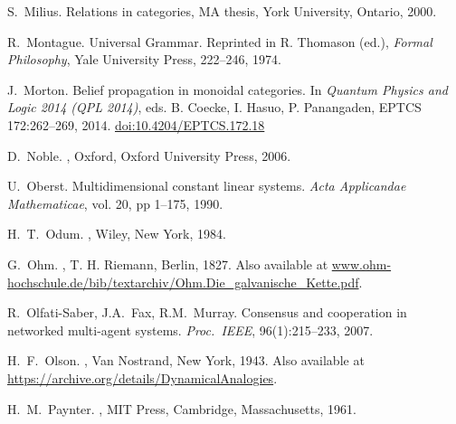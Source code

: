 \begin{thebibliography}{RSW00}
    S.\ Milius.
    \newblock Relations in categories, MA thesis, York University,
    Ontario, 2000.

    R.\ Montague.
    \newblock Universal Grammar.
    \newblock Reprinted in R. Thomason (ed.), {\em Formal Philosophy}, Yale
    University Press, 222--246, 1974. 

    J.\ Morton.
    \newblock Belief propagation in monoidal categories. 
    \newblock In {\em Quantum Physics and Logic 2014 (QPL 2014)}, eds. B.
    Coecke, I. Hasuo, P. Panangaden, EPTCS 172:262--269, 2014.  
    \newblock
    \href{http://dx.doi.org/10.4204/EPTCS.172.18}{doi:10.4204/EPTCS.172.18 }
    
    D.\ Noble.
    , Oxford, Oxford
    University Press, 2006.

    U.\ Oberst.
    \newblock Multidimensional constant linear systems.
    \newblock \emph{Acta Applicandae Mathematicae}, vol. 20, pp 1--175, 1990.

    H.\ T.\ Odum.
    , Wiley, New York, 1984.

    G.\ Ohm.
    ,
    T. H. Riemann, Berlin, 1827.
    \newblock Also available at
    \href{http://www.ohm-hochschule.de/bib/textarchiv/Ohm.Die_galvanische_Kette.pdf}{www.ohm-hochschule.de/bib/textarchiv/Ohm.Die\_galvanische\_Kette.pdf}.

    R.\ Olfati-Saber, J.A.\ Fax, R.M.\ Murray.
    \newblock Consensus and cooperation in networked multi-agent systems.
    \newblock \emph{Proc.\ IEEE}, 96(1):215--233, 2007.

    H.\ F.\ Olson.
    , Van
    Nostrand, New York, 1943.
    \newblock Also available at 
    \href{https://archive.org/details/DynamicalAnalogies}
    {https://archive.org/details/DynamicalAnalogies}.


    H.\ M.\ Paynter.
    , MIT Press, Cambridge, Massachusetts, 1961.


\end{thebibliography}
